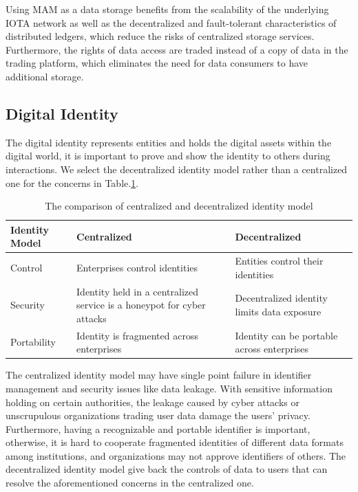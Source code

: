 \documentclass[conference]{IEEEtran}
\begin{document}
Using MAM as a data storage benefits from the scalability of the underlying IOTA network as well as the decentralized and fault-tolerant characteristics of distributed ledgers, which reduce the risks of centralized storage services. Furthermore, the rights of data access are traded instead of a copy of data in the trading platform, which eliminates the need for data consumers to have additional storage.

\subsection{Digital Identity}
The digital identity represents entities and holds the digital assets within the digital world, it is important to prove and show the identity to others during interactions. We select the decentralized identity model rather than a centralized one for the concerns in Table.\ref{tab:did}.

\begin{table}[h]
	\caption{The comparison of centralized and decentralized identity model}
	\label{tab:did}
	\begin{tabularx}{\linewidth}{|l|X|X|}
	\hline
		\textbf{Identity Model} & \textbf{Centralized} & \textbf{Decentralized} \\
		\hline
		Control & Enterprises control identities & Entities control their identities \\
		\hline
		Security & Identity held in a centralized service is a honeypot for cyber attacks & Decentralized identity limits data exposure \\
		\hline
		Portability & Identity is fragmented across enterprises & Identity can be portable across enterprises \\
		\hline
	\end{tabularx}
\end{table}

The centralized identity model may have single point failure in identifier management and security issues like data leakage. With sensitive information holding on certain authorities, the leakage caused by cyber attacks or unscrupulous organizations trading user data damage the users' privacy. Furthermore, having a recognizable and portable identifier is important, otherwise, it is hard to cooperate fragmented identities of different data formats among institutions, and organizations may not approve identifiers of others. The decentralized identity model give back the controls of data to users that can resolve the aforementioned concerns in the centralized one.
\end{document}
